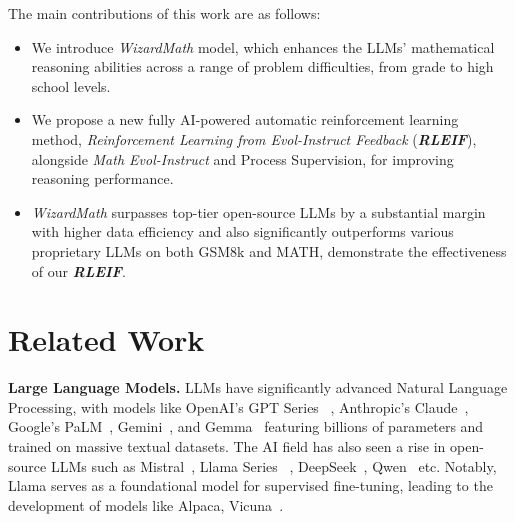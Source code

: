 The main contributions of this work are as follows:

\begin{itemize}
\item We introduce \emph{WizardMath} model, which enhances the LLMs' mathematical reasoning abilities across a range of problem difficulties, from grade to high school levels.
\item We propose a new fully AI-powered automatic reinforcement learning method,  \emph{Reinforcement Learning from Evol-Instruct Feedback} (\textbf{\emph{RLEIF}}), alongside \emph{Math Evol-Instruct} and Process Supervision, for improving reasoning performance. 
\item \emph{WizardMath} surpasses top-tier open-source LLMs by a substantial margin with higher data efficiency and also significantly outperforms various proprietary LLMs on both GSM8k and MATH, demonstrate the effectiveness of our \textbf{\emph{RLEIF}}.
\end{itemize}

\section{Related Work}

\textbf{Large Language Models.} LLMs have significantly advanced Natural Language Processing, with models like OpenAI's GPT Series ~\citep{GPT3,openai2023gpt4}, Anthropic's Claude~\citep{bai2022constitutional-claude}, Google's PaLM~\citep{PaLM,palm2}, Gemini~\citep{geminiteam2023gemini}, and Gemma~\citep{team2024gemma} featuring billions of parameters and trained on massive textual datasets. The AI field has also seen a rise in open-source LLMs such as Mistral~\citep{jiang2023mistral}, Llama Series ~\citep{touvron2023llama,touvron2023llama2, dubey2024-llama3, taylor2022galactica},  DeepSeek~\citep{Bi2024DeepSeekLS, shao2024-deepseekmath}, Qwen~\citep{Bai2023QwenTR, yang2024-qwen2.5-math} etc. Notably, Llama serves as a foundational model for supervised fine-tuning, leading to the development of models like Alpaca, Vicuna~\citep{alpaca,vicuna2023}.

